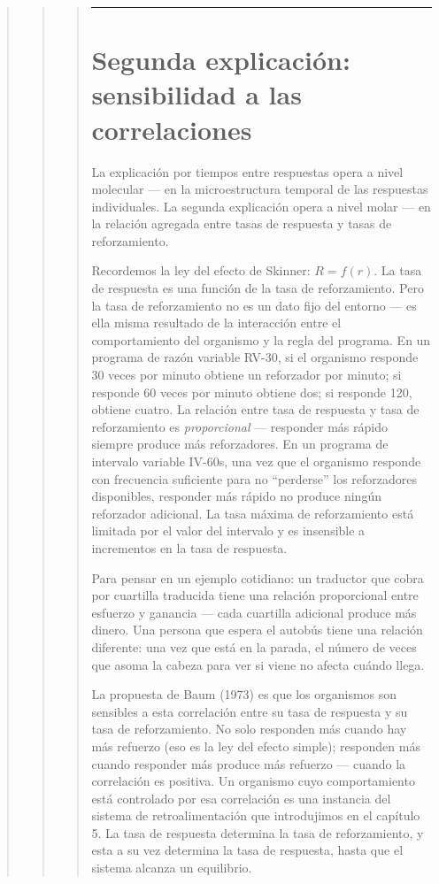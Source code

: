 \documentclass[
  letterpaper,
  DIV=11,
  numbers=noendperiod]{scrreprt}
\begin{document}
\begin{tcolorbox}[enhanced jigsaw, toprule=.15mm, arc=.35mm, colback=white, opacityback=0, colframe=quarto-callout-note-color-frame, breakable, rightrule=.15mm, left=2mm, leftrule=.75mm, bottomrule=.15mm]
\begin{quote}
\begin{quote}
\begin{quote}
\begin{center}\rule{0.5\linewidth}{0.5pt}\end{center}

\section{Segunda explicación: sensibilidad a las
correlaciones}\label{segunda-explicaciuxf3n-sensibilidad-a-las-correlaciones}

La explicación por tiempos entre respuestas opera a nivel molecular ---
en la microestructura temporal de las respuestas individuales. La
segunda explicación opera a nivel molar --- en la relación agregada
entre tasas de respuesta y tasas de reforzamiento.

Recordemos la ley del efecto de Skinner: \(R = f(r)\). La tasa de
respuesta es una función de la tasa de reforzamiento. Pero la tasa de
reforzamiento no es un dato fijo del entorno --- es ella misma resultado
de la interacción entre el comportamiento del organismo y la regla del
programa. En un programa de razón variable RV-30, si el organismo
responde 30 veces por minuto obtiene un reforzador por minuto; si
responde 60 veces por minuto obtiene dos; si responde 120, obtiene
cuatro. La relación entre tasa de respuesta y tasa de reforzamiento es
\emph{proporcional} --- responder más rápido siempre produce más
reforzadores. En un programa de intervalo variable IV-60s, una vez que
el organismo responde con frecuencia suficiente para no ``perderse'' los
reforzadores disponibles, responder más rápido no produce ningún
reforzador adicional. La tasa máxima de reforzamiento está limitada por
el valor del intervalo y es insensible a incrementos en la tasa de
respuesta.

Para pensar en un ejemplo cotidiano: un traductor que cobra por
cuartilla traducida tiene una relación proporcional entre esfuerzo y
ganancia --- cada cuartilla adicional produce más dinero. Una persona
que espera el autobús tiene una relación diferente: una vez que está en
la parada, el número de veces que asoma la cabeza para ver si viene no
afecta cuándo llega.

La propuesta de Baum (1973) es que los organismos son sensibles a esta
correlación entre su tasa de respuesta y su tasa de reforzamiento. No
solo responden más cuando hay más refuerzo (eso es la ley del efecto
simple); responden más cuando responder más produce más refuerzo ---
cuando la correlación es positiva. Un organismo cuyo comportamiento está
controlado por esa correlación es una instancia del sistema de
retroalimentación que introdujimos en el capítulo 5. La tasa de
respuesta determina la tasa de reforzamiento, y esta a su vez determina
la tasa de respuesta, hasta que el sistema alcanza un equilibrio.


\end{quote}
\end{quote}
\end{quote}
\end{tcolorbox}
\end{document}
